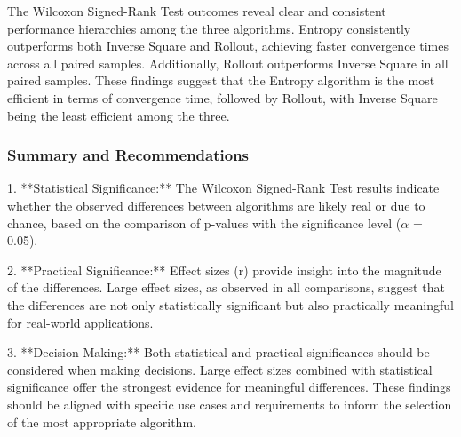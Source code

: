 \documentclass[../report.tex]{subfiles}
\begin{document}
    The Wilcoxon Signed-Rank Test outcomes reveal clear and consistent performance hierarchies among the three algorithms. Entropy consistently outperforms both Inverse Square and Rollout, achieving faster convergence times across all paired samples. Additionally, Rollout outperforms Inverse Square in all paired samples. These findings suggest that the Entropy algorithm is the most efficient in terms of convergence time, followed by Rollout, with Inverse Square being the least efficient among the three.

    \subsubsection{Summary and Recommendations}

    1. **Statistical Significance:**  
    The Wilcoxon Signed-Rank Test results indicate whether the observed differences between algorithms are likely real or due to chance, based on the comparison of p-values with the significance level ($\alpha$ = 0.05).

    2. **Practical Significance:**  
    Effect sizes (r) provide insight into the magnitude of the differences. Large effect sizes, as observed in all comparisons, suggest that the differences are not only statistically significant but also practically meaningful for real-world applications.

    3. **Decision Making:**  
    Both statistical and practical significances should be considered when making decisions. Large effect sizes combined with statistical significance offer the strongest evidence for meaningful differences. These findings should be aligned with specific use cases and requirements to inform the selection of the most appropriate algorithm.
\end{document}
